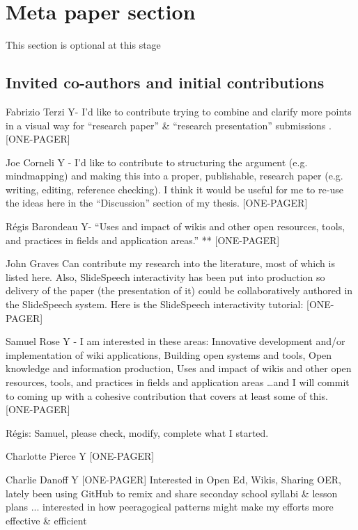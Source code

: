 \documentclass{acm_proc_article-sp}
\begin{document}
%
%
%
%

\section{Meta paper section}

This section is optional at this stage

\subsection{Invited co-authors and initial contributions}

    Fabrizio Terzi Y- I'd like to contribute trying to combine and clarify more points in a visual way for ``research paper'' \& ``research presentation'' submissions . [ONE-PAGER]

    Joe Corneli Y - I'd like to contribute to structuring the argument (e.g. mindmapping) and making this into a proper, publishable, research paper (e.g. writing, editing, reference checking). I think it would be useful for me to re-use the ideas here in the ``Discussion'' section of my thesis. [ONE-PAGER]

    R\'egis Barondeau Y- ``Uses and impact of wikis and other open resources, tools, and practices in fields and application areas.'' ** [ONE-PAGER]

    John Graves Can contribute my research into the literature, most of which is listed here. Also, SlideSpeech interactivity has been put into production so delivery of the paper (the presentation of it) could be collaboratively authored in the SlideSpeech system. Here is the SlideSpeech interactivity tutorial: [ONE-PAGER]

    Samuel Rose Y - I am interested in these areas: Innovative development and/or implementation of wiki applications, Building open systems and tools, Open knowledge and information production, Uses and impact of wikis and other open resources, tools, and practices in fields and application areas \ldots and I will commit to coming up with a cohesive contribution that covers at least some of this. [ONE-PAGER]

        R\'egis: Samuel, please check, modify, complete what I started. 

    Charlotte Pierce Y [ONE-PAGER]

    Charlie Danoff Y [ONE-PAGER] Interested in Open Ed, Wikis, Sharing OER, lately been using GitHub to remix and share seconday school syllabi \& lesson plans ... interested in how peeragogical patterns might make my efforts more effective \& efficient
\end{document}
